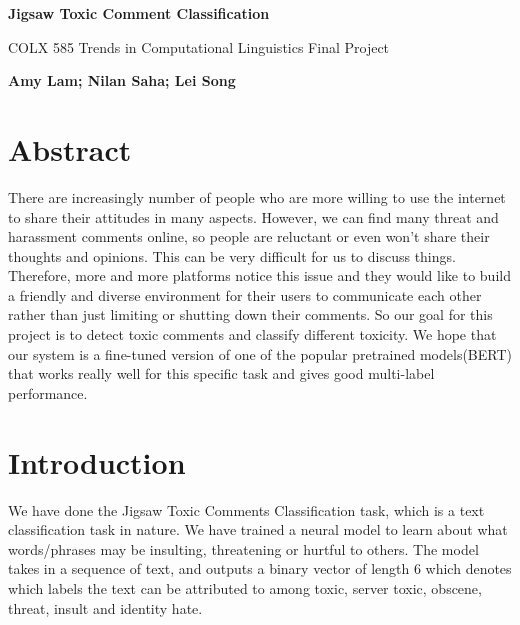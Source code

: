 \documentclass[sigconf]{acmart}
\begin{document}



\thispagestyle{plain}
\begin{center}
	\Large
	\textbf{Jigsaw Toxic Comment Classification}
	
	\vspace{0.4cm}
	\large
	COLX 585 Trends in Computational Linguistics Final Project
	
	\vspace{0.4cm}
	\textbf{{Amy Lam;} 	{Nilan Saha;}	{Lei Song}}
	
\end{center}

\section{Abstract}

There are increasingly number of people who are more willing to use the internet to share their attitudes in many aspects. However, we can find many threat and harassment comments online, so people are reluctant or even won't share their thoughts and opinions. This can be very difficult for us to discuss things. Therefore, more and more platforms notice this issue and they would like to build a friendly and diverse environment for their users to communicate each other rather than just limiting or shutting down their comments. So our goal for this project is to detect toxic comments and classify different toxicity. We hope that our system is a fine-tuned version of one of the popular pretrained models(BERT) that works really well for this specific task and gives good multi-label performance.

\section{Introduction}

We have done the Jigsaw Toxic Comments Classification task, which is a text classification task in nature. We have trained a neural model to learn about what words/phrases may be insulting, threatening or hurtful to others. The model takes in a sequence of text, and outputs a binary vector of length 6 which denotes which labels the text can be attributed to among toxic, server toxic, obscene, threat, insult and identity hate.
\end{document}

